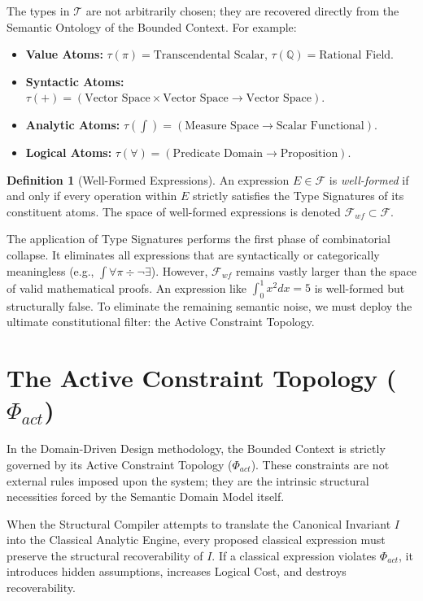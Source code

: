 \documentclass[12pt,openany]{extbook}
\theoremstyle{plain}
\theoremstyle{definition}
\newtheorem{definition}{Definition}[chapter]
\begin{document}
The types in $\mathcal{T}$ are not arbitrarily chosen; they are recovered directly from the Semantic Ontology of the Bounded Context. For example:
\begin{itemize}
    \item \textbf{Value Atoms:} $\tau(\pi) = \text{Transcendental Scalar}$, $\tau(\mathbb{Q}) = \text{Rational Field}$.
    \item \textbf{Syntactic Atoms:} $\tau(+) = (\text{Vector Space} \times \text{Vector Space} \to \text{Vector Space})$.
    \item \textbf{Analytic Atoms:} $\tau(\int) = (\text{Measure Space} \to \text{Scalar Functional})$.
    \item \textbf{Logical Atoms:} $\tau(\forall) = (\text{Predicate Domain} \to \text{Proposition})$.
\end{itemize}

\begin{definition}[Well-Formed Expressions]
An expression $E \in \mathcal{F}$ is \emph{well-formed} if and only if every operation within $E$ strictly satisfies the Type Signatures of its constituent atoms. The space of well-formed expressions is denoted $\mathcal{F}_{wf} \subset \mathcal{F}$.
\end{definition}

The application of Type Signatures performs the first phase of combinatorial collapse. It eliminates all expressions that are syntactically or categorically meaningless (e.g., $\int \forall \pi \div \neg \exists$). However, $\mathcal{F}_{wf}$ remains vastly larger than the space of valid mathematical proofs. An expression like $\int_0^1 x^2 dx = 5$ is well-formed but structurally false. To eliminate the remaining semantic noise, we must deploy the ultimate constitutional filter: the Active Constraint Topology.

\section{The Active Constraint Topology ($\Phi_{act}$)}

In the Domain-Driven Design methodology, the Bounded Context is strictly governed by its Active Constraint Topology ($\Phi_{act}$). These constraints are not external rules imposed upon the system; they are the intrinsic structural necessities forced by the Semantic Domain Model itself.

When the Structural Compiler attempts to translate the Canonical Invariant $I$ into the Classical Analytic Engine, every proposed classical expression must preserve the structural recoverability of $I$. If a classical expression violates $\Phi_{act}$, it introduces hidden assumptions, increases Logical Cost, and destroys recoverability.
\end{document}
